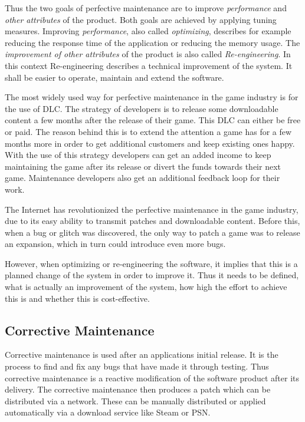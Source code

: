Thus the two goals of perfective maintenance are to improve \textit{performance} and \textit{other attributes} of the product. Both goals are achieved by applying tuning measures. Improving \textit{performance}, also called \textit{optimizing}, describes for example reducing the response time of the application or reducing the memory usage. The \textit{improvement of other attributes} of the product is also called \textit{Re-engineering}. In this context Re-engineering describes a technical improvement of the system. It shall be easier to operate, maintain and extend the software.\citep{sneed_software_2005}

The most widely used way for perfective maintenance in the game industry is for the use of DLC.\citep{jarman_testing_2010} The strategy of developers is to release some downloadable content a few months after the release of their game.\citep{jarman_testing_2010} This DLC can either be free or paid. The reason behind this is to extend the attention a game has for a few months more in order to get additional customers and keep existing ones happy.\citep{jarman_testing_2010} With the use of this strategy developers can get an added income to keep maintaining the game after its release or divert the funds towards their next game.\citep{jarman_testing_2010} Maintenance developers also get an additional feedback loop for their work. \citep{jarman_testing_2010}

The Internet has revolutionized the perfective maintenance in the game industry, due to its easy ability to transmit patches and downloadable content. \citep{jarman_testing_2010} Before this, when a bug or glitch was discovered, the only way to patch a game was to release an expansion, which in turn could introduce even more bugs. \citep{jarman_testing_2010}

However, when optimizing or re-engineering the software, it implies that this is a planned change of the system in order to improve it. Thus it needs to be defined, what is actually an improvement of the system, how high the effort to achieve this is and whether this is cost-effective.\citep{sneed_software_2005}


\subsection{Corrective Maintenance}
\label{subsec:correctiveMaintenance}
Corrective maintenance is used after an applications initial release. It is the process to find and fix any bugs that have made it through testing.\citep{jarman_testing_2010} Thus corrective maintenance is a reactive modification of the software product after its delivery.\citep{pigoski_software_2015} The corrective maintenance then produces a patch which can be distributed via a network. These can be manually distributed or applied automatically via a download service like Steam or PSN. \citep{jarman_testing_2010} 

